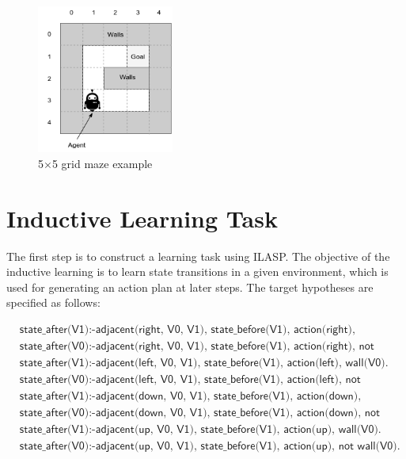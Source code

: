 \begin{figure}[!htb]
\centering
\includegraphics[width=0.4\textwidth]{./figures/environment_example}
\caption{5$\times$5 grid maze example}
\label{environment_example}
\end{figure}

\section{Inductive Learning Task}
\label{sec:inductive_learning_task}
The first step is to construct a learning task using ILASP. The objective of the inductive learning is to learn state transitions in a given environment, which is used for generating an action plan at later steps.
The target hypotheses are specified as follows:

\begin{equation}
\begin{split}
&\textsf{state\_after(V1):-adjacent(right, V0, V1), state\_before(V1), action(right), wall(V0).}\\
&\textsf{state\_after(V0):-adjacent(right, V0, V1), state\_before(V1), action(right), not wall(V0).}\\
&\textsf{state\_after(V1):-adjacent(left, V0, V1), state\_before(V1), action(left), wall(V0).}\\
&\textsf{state\_after(V0):-adjacent(left, V0, V1), state\_before(V1), action(left), not wall(V0).}\\
&\textsf{state\_after(V1):-adjacent(down, V0, V1), state\_before(V1), action(down), wall(V0).}\\
&\textsf{state\_after(V0):-adjacent(down, V0, V1), state\_before(V1), action(down), not wall(V0).}\\
&\textsf{state\_after(V1):-adjacent(up, V0, V1), state\_before(V1),  action(up), wall(V0).}\\
&\textsf{state\_after(V0):-adjacent(up, V0, V1), state\_before(V1), action(up), not wall(V0).}
\end{split}
\label{target_hypothesis}
\end{equation}

